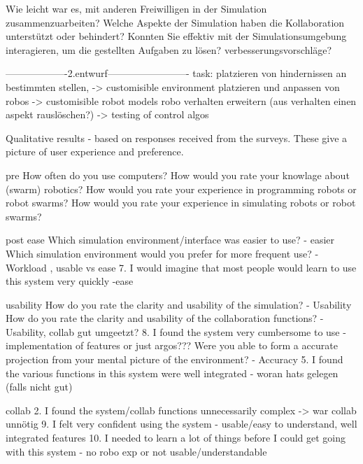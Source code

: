 \documentclass[german,version-2020-11]{uzl-thesis}
\begin{document}
      \begin{Code}
        Wie leicht war es, mit anderen Freiwilligen in der Simulation zusammenzuarbeiten?
        Welche Aspekte der Simulation haben die Kollaboration unterstützt oder behindert?
        Konnten Sie effektiv mit der Simulationsumgebung interagieren, um die gestellten Aufgaben zu lösen?
        verbesserungsvorschläge?

        -------------------2.entwurf-------------------------
        task: 
        platzieren von hindernissen an bestimmten stellen, -> customisible environment
        platzieren und anpassen von robos -> customisible robot models
        robo verhalten erweitern (aus verhalten einen aspekt rauslöschen?) -> testing of control algos
        
        Qualitative results - based on responses received from the surveys. 
          These give a picture of user experience and preference. 
            
            pre
              How often do you use computers? 
              How would you rate your knowlage about (swarm) robotics?
              How would you rate your experience in programming robots or robot swarms?
              How would you rate your experience in simulating robots or robot swarms?
          
          
            post
              ease
              Which simulation environment/interface was easier to use? - easier
              Which simulation environment would you prefer for more frequent use? - Workload  , usable vs ease
              7. I would imagine that most people would learn to use this system very quickly -ease
      
              usability
              How do you rate the clarity and usability of the simulation? - Usability
              How do you rate the clarity and usability of the collaboration functions? - Usability, collab gut umgeetzt?
              8. I found the system very cumbersome to use - implementation of features or just argos???
              Were you able to form a accurate projection from your mental picture of the environment? - Accuracy
              5. I found the various functions in this system were well integrated - woran hats gelegen (falls nicht gut)
              
              collab
              2. I found the system/collab functions unnecessarily complex -> war collab unnötig
              9. I felt very confident using the system - usable/easy to understand, well integrated features
              10. I needed to learn a lot of things before I could get going with this system - no robo exp or not usable/understandable
            

\end{Code}
\end{document}
